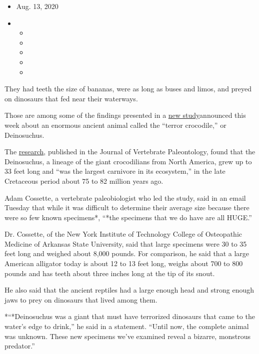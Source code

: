 \begin{itemize}
\item
  Aug. 13, 2020
\item
  \begin{itemize}
  \item
  \item
  \item
  \item
  \item
  \end{itemize}
\end{itemize}

They had teeth the size of bananas, were as long as buses and limos, and
preyed on dinosaurs that fed near their waterways.

Those are among some of the findings presented in a
\href{https://www.tandfonline.com/doi/full/10.1080/02724634.2020.1767638}{new
study}announced this week about an enormous ancient animal called the
``terror crocodile,'' or Deinosuchus.

The
\href{https://www.tandfonline.com/doi/full/10.1080/02724634.2020.1767638}{research},
published in the Journal of Vertebrate Paleontology, found that the
Deinosuchus, a lineage of the giant crocodilians from North America,
grew up to 33 feet long and ``was the largest carnivore in its
ecosystem,'' in the late Cretaceous period about 75 to 82 million years
ago.

Adam Cossette, a vertebrate paleobiologist who led the study, said in an
email Tuesday that while it was difficult to determine their average
size because there were so few known specimens*, ``*the specimens that
we do have are all HUGE.''

Dr. Cossette, of the New York Institute of Technology College of
Osteopathic Medicine of Arkansas State University, said that large
specimens were 30 to 35 feet long and weighed about 8,000 pounds. For
comparison, he said that a large American alligator today is about 12 to
13 feet long, weighs about 700 to 800 pounds and has teeth about three
inches long at the tip of its snout.

He also said that the ancient reptiles had a large enough head and
strong enough jaws to prey on dinosaurs that lived among them.

*``*Deinosuchus was a giant that must have terrorized dinosaurs that
came to the water's edge to drink,'' he said in a statement. ``Until
now, the complete animal was unknown. These new specimens we've examined
reveal a bizarre, monstrous predator.''

